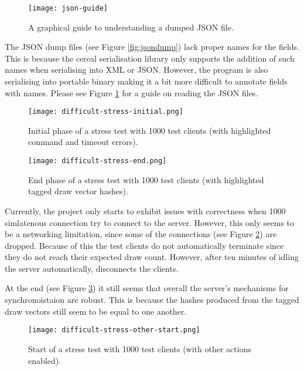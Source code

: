 \documentclass[article]{uom-coursework}
\begin{document}
\begin{figure}[H]
\centering
\texttt{[image: json-guide]}
\caption{A graphical guide to understanding a dumped JSON file.}
\label{fig:jsondumpguide}
\end{figure}

\begin{note}
    The JSON dump files (see Figure \ref{fig:jsondump}) lack
    proper names for the fields. This is because the cereal
    serialisation library only supports the addition of such
    names when serialising into XML or JSON. However, the
    program is also serialising into portable binary making it a
    bit more difficult to annotate fields with names.  Please
    see Figure \ref{fig:jsondumpguide} for a guide on reading
    the JSON files.
\end{note}

\begin{figure}[H]
\centering
\texttt{[image: difficult-stress-initial.png]}
\caption{Initial phase of a stress test with 1000 test clients
(with highlighted command and timeout errors).}
\label{fig:initial1000stress}
\end{figure}

\begin{figure}[H]
\centering
\texttt{[image: difficult-stress-end.png]}
\caption{End phase of a stress test with 1000 test clients (with
highlighted tagged draw vector hashes).}
\label{fig:end1000stress}
\end{figure}

Currently, the project only starts to exhibit issues with
correctness when 1000 simlatenous connection try to connect to
the server. However, this only seems to be a networking
limitation, since some of the connections (see Figure
\ref{fig:initial1000stress}) are dropped. Because of this the
test clients do not automatically terminate since they do not
reach their expected draw count. However, after ten minutes of
idling the server automatically, disconnects the clients.

At the end (see Figure \ref{fig:end1000stress}) it still seems
that overall the server's mechanisms for synchronoistaion are
robust. This is because the hashes produced from the tagged draw
vectors still seem to be equal to one another.

\begin{figure}[H]
\centering
\texttt{[image: difficult-stress-other-start.png]}
\caption{Start of a stress test with 1000 test clients (with
other actions enabled).}
\label{fig:start1000stressother}
\end{figure}
\end{document}
